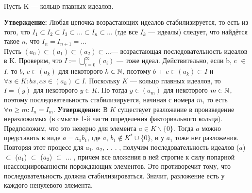 \ \\ 
Пусть K — кольцо главных идеалов.

\textbf{Утверждение:} Любая цепочка возрастающих идеалов стабилизируется, то есть из того, что $I_1 \subset I_2 \subset I_3 \subset . . . \subset I_n \subset . . .$
(где все $I_k$ — идеалы) следует, что найдётся такое $n$, что $I_n= I_{n+1} = ...$
\\
\Proof
Пусть $(a_0) \subset (a_1) \subset(a_2) \subset...$— возрастающая последовательность идеалов в K. Проверим, что $I := \bigcup\limits_{i=0}^{\infty}(a_i)$ — тоже идеал. Действительно, если b, c $\in$ $I$, то
$b$, $c \in (a_k)$ для некоторого $k \in \mathbb{N}$, \newline поэтому $b$ + $c \in (a_k) \subset I$ и $\forall x \in K : bx, c x \in (a_k) \subset I$.
\newline Поскольку $K$ — кольцо главных идеалов, то $I = (y)$ для некоторого $y\in K$. Но тогда
$y  \in (a_m)$ для некоторого $m \in \mathbb{N}$, поэтому последовательность стабилизируется, начиная с номера $m$, то есть $\forall n \geq m : I_n = I_m$.\EndProof
\bigbreak
\textbf{Утверждение: } В $K$ существует разложение в произведение неразложимых (в смысле 1-й части определения факториального кольца).
\\
\Proof Предположим, что это неверно для элемента $a \in K \backslash \{0\}$. Тогда $a$ можно
представить в виде $a = a_1 b_1$, где $a$, $b_1 \not\in K^* \cup \{0\}$, и у $a_1$ тоже нет разложения. Повторяя этот процесс для $a_1$, $a_2$, . . . , получим последовательность идеалов ($a$) $\subset$ ($a_1$) $\subset$ ($a_2$) $\subset$ ... ,
причем все вложения в ней строгие к силу попарной неассоциированности порождающих
элементов. Это противоречит тому, что последовательность должна стабилизироваться.
Значит, разложение есть у каждого ненулевого элемента.\EndProof
